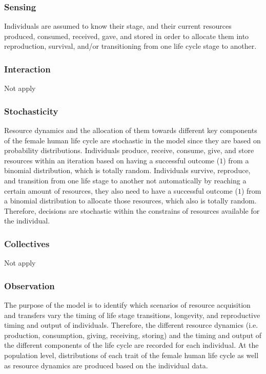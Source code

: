 \documentclass{article}
\begin{document}
\subsubsection{Sensing}

Individuals are assumed to know their stage, and their current resources produced, consumed, received, gave, and stored in order to allocate them into reproduction, survival, and/or transitioning from one life cycle stage to another.

\subsubsection{Interaction}

Not apply

\subsubsection{Stochasticity}

Resource dynamics and the allocation of them towards different key components of the female human life cycle are stochastic in the model since they are based on probability distributions. Individuals produce, receive, consume, give, and store resources within an iteration based on having a successful outcome ($1$) from a binomial distribution, which is totally random. Individuals survive, reproduce, and transition from one life stage to another not automatically by reaching a certain amount of resources, they also need to have a successful outcome ($1$) from a binomial distribution to allocate those resources, which also is totally random. Therefore, decisions are stochastic within the constrains of resources available for the individual.

\subsubsection{Collectives}

Not apply

\subsubsection{Observation}

The purpose of the model is to identify which scenarios of resource acquisition and transfers vary the timing of life stage transitions, longevity, and reproductive timing and output of individuals. Therefore, the different resource dynamics (i.e. production, consumption, giving, receiving, storing) and the timing and output of the different components of the life cycle are recorded for each individual. At the population level, distributions of each trait of the female human life cycle as well as resource dynamics are produced based on the individual data.
\end{document}
